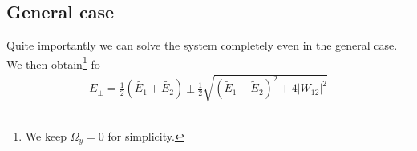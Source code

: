 \subsection{General case}

Quite importantly we can solve the system completely even in the general case. We then obtain\footnote{We keep $\Omega_y =0$ for simplicity.} fo
\begin{align}\label{eq:Epm}
 E_\pm = \frac{1}{2}\left(\tilde{E_1}+\tilde{E_2}\right) \pm \frac{1}{2} \sqrt{\left(\tilde{E}_1-\tilde{E}_2\right)^2+4 \left|W_{12}\right|^2}
\end{align}